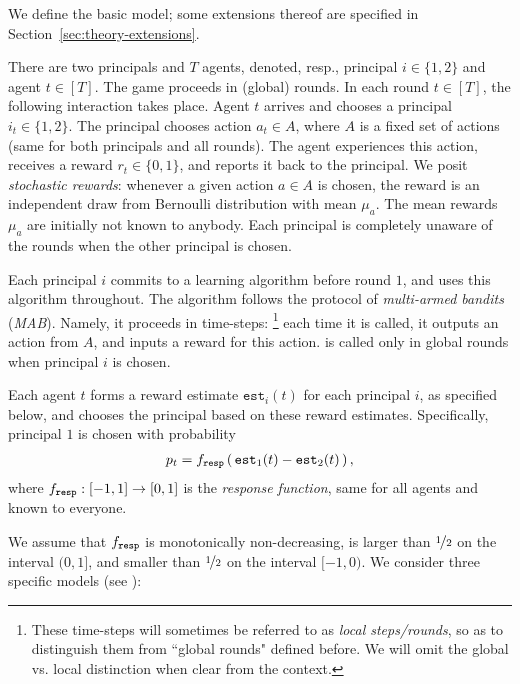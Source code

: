 
We define the basic model; some extensions thereof are specified in  Section~\ref{sec:theory-extensions}.

 There are two principals and $T$ agents,
denoted, resp., principal $i\in \{1,2\}$ and agent $t\in [T]$. The game proceeds in (global) rounds. In each round $t\in [T]$, the following  interaction takes place. Agent $t$ arrives and chooses a principal $i_t\in \{1,2\}$. The principal chooses action $a_t\in A$, where $A$ is a fixed set of actions (same for both principals and all rounds). The agent experiences this action, receives a reward $r_t\in \{ 0,1\}$, and reports it back to the principal. We posit \emph{stochastic rewards}: whenever a given action $a\in A$ is chosen, the reward is an independent draw from Bernoulli distribution with mean $\mu_a$. The mean rewards $\mu_a$ are initially not known to anybody. Each principal is completely unaware of the rounds when the other principal is chosen.

Each principal $i$ commits to a learning algorithm \alg[i] before round $1$, and uses this algorithm throughout. The algorithm follows the protocol of \emph{multi-armed bandits} (\emph{MAB}). Namely, it proceeds in time-steps:%
\footnote{These time-steps will sometimes be referred to as \emph{local steps/rounds}, so as to distinguish them from ``global rounds" defined before. We will omit the global vs. local distinction when clear from the context.} each time it is called, it outputs an action from $A$, and inputs a reward for this action. \alg[i] is called only in global rounds when principal $i$ is chosen.

\newcommand{\est}{\mathtt{est}}

 Each agent $t$ forms a reward estimate $\est_i(t)$ for each principal $i$, as specified below, and chooses the principal based on these reward estimates. Specifically, principal $1$ is chosen with probability
\begin{align}
p_t = \respF\rbr{ \est_1(t) - \est_2(t) },
\end{align}
where $f_{\mathtt{resp}}:[-1,1]\to [0,1]$ is the \emph{response function}, same for all agents and known to everyone.

We assume that $f_{\mathtt{resp}}$ is monotonically non-decreasing, is larger than $\nicefrac12$ on the interval $(0,1]$, and smaller than $\nicefrac12$ on the interval $[-1,0)$. We consider three specific models (see ):

